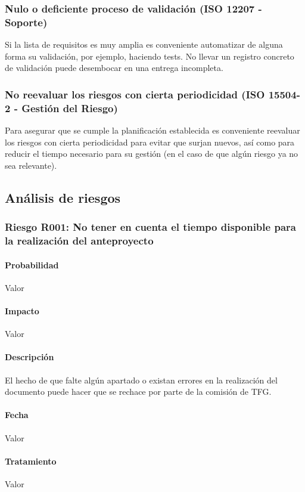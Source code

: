\documentclass[10pt,a4paper]{article}
\begin{document}
			\subsubsection{Nulo o deficiente proceso de validación (ISO 12207 - Soporte)}
			Si la lista de requisitos es muy amplia es conveniente automatizar de alguna forma su validación, por ejemplo, haciendo tests. 
No llevar un registro concreto de validación puede desembocar en una entrega incompleta.
			\subsubsection{No reevaluar los riesgos con cierta periodicidad (ISO 15504-2 - Gestión del Riesgo)}
			Para asegurar que se cumple la planificación establecida es conveniente reevaluar los riesgos con cierta periodicidad para evitar que surjan nuevos, así como para reducir el tiempo necesario para su gestión (en el caso de que algún riesgo ya no sea relevante).
		\subsection{Análisis de riesgos}
			\subsubsection{Riesgo R001: No tener en cuenta el tiempo disponible para la realización del anteproyecto}
				\paragraph{Probabilidad} Valor
				\paragraph{Impacto}	Valor
				\paragraph{Descripción} El hecho de que falte algún apartado o existan errores en la realización del documento puede hacer que se rechace por parte de la comisión de TFG. 
				\paragraph{Fecha} Valor %
				\paragraph{Tratamiento} Valor %
\end{document}
